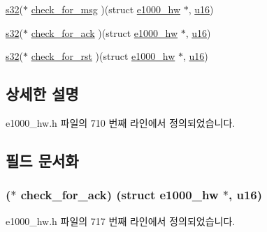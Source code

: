 \begin{DoxyCompactItemize}
\item 
\hyperlink{lib_2igb_2e1000__osdep_8h_ae9b1af5c037e57a98884758875d3a7c4}{s32}($\ast$ \hyperlink{structe1000__mbx__operations_a5574b564ba8d1dbfd72f6a98f1a30ee8}{check\+\_\+for\+\_\+msg} )(struct \hyperlink{structe1000__hw}{e1000\+\_\+hw} $\ast$, \hyperlink{lib_2igb_2e1000__osdep_8h_acdc9cf0314be0ae5a01d6d4379a95edd}{u16})
\item 
\hyperlink{lib_2igb_2e1000__osdep_8h_ae9b1af5c037e57a98884758875d3a7c4}{s32}($\ast$ \hyperlink{structe1000__mbx__operations_ac1c6e59c84066e1c5ce5b86580db4c0b}{check\+\_\+for\+\_\+ack} )(struct \hyperlink{structe1000__hw}{e1000\+\_\+hw} $\ast$, \hyperlink{lib_2igb_2e1000__osdep_8h_acdc9cf0314be0ae5a01d6d4379a95edd}{u16})
\item 
\hyperlink{lib_2igb_2e1000__osdep_8h_ae9b1af5c037e57a98884758875d3a7c4}{s32}($\ast$ \hyperlink{structe1000__mbx__operations_a0a41fd1de41d0c29fa2e8c833c39055e}{check\+\_\+for\+\_\+rst} )(struct \hyperlink{structe1000__hw}{e1000\+\_\+hw} $\ast$, \hyperlink{lib_2igb_2e1000__osdep_8h_acdc9cf0314be0ae5a01d6d4379a95edd}{u16})
\end{DoxyCompactItemize}


\subsection{상세한 설명}


e1000\+\_\+hw.\+h 파일의 710 번째 라인에서 정의되었습니다.



\subsection{필드 문서화}
\subsubsection[{\texorpdfstring{check\+\_\+for\+\_\+ack}{check_for_ack}}]{($\ast$ check\+\_\+for\+\_\+ack) (struct {\bf e1000\+\_\+hw} $\ast$, {\bf u16})}\hypertarget{structe1000__mbx__operations_ac1c6e59c84066e1c5ce5b86580db4c0b}{}\label{structe1000__mbx__operations_ac1c6e59c84066e1c5ce5b86580db4c0b}


e1000\+\_\+hw.\+h 파일의 717 번째 라인에서 정의되었습니다.

